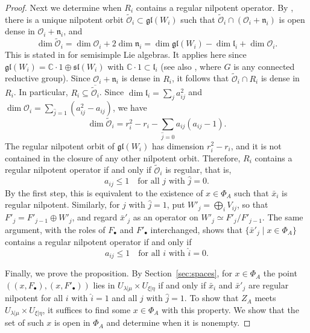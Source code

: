 \documentclass[11pt,a4paper]{amsart}
\theoremstyle{definition}
\theoremstyle{remark}
\newcommand{\C}{\mathbb C}
\newcommand{\lm}{\lambda|\mu}
\newcommand{\xh}{\xi|\eta}
\numberwithin{equation}{section}
\begin{document}
\begin{proof}
Next we determine when $R_i$ contains a regular nilpotent operator. By
\cite[Theorem~7.1.1]{CM}, there is a unique nilpotent orbit
$\widetilde{\mathcal O}_i\subset\mathfrak{gl}(W_i)$ such that
$\widetilde{\mathcal O}_i\cap(\mathcal O_i+\mathfrak n_i)$ is open dense
in $\mathcal O_i+\mathfrak n_i$, and
$$
\dim\widetilde{\mathcal O}_i
=\dim\mathcal O_i+2\dim\mathfrak n_i
=\dim\mathfrak{gl}(W_i)-\dim\mathfrak l_i+\dim\mathcal O_i .
$$
This is stated in \cite{CM} for semisimple Lie algebras. It applies here
since $\mathfrak{gl}(W_i)=\C\cdot1\oplus\mathfrak{sl}(W_i)$ with
$\C\cdot1\subset\mathfrak l_i$ (see also \cite{LS79}, where $G$ is any
connected reductive group). Since $\mathcal O_i+\mathfrak n_i$ is dense in
$R_i$, it follows that $\widetilde{\mathcal O}_i\cap R_i$ is dense in
$R_i$. In particular, $R_i\subseteq\overline{\widetilde{\mathcal O}_i}$.
Since $\dim\mathfrak l_i=\sum_ja_{ij}^2$ and
$\dim\mathcal O_i=\sum_{\widehat j=1}(a_{ij}^2-a_{ij})$, we have
$$
\dim\widetilde{\mathcal O}_i
=r_i^2-r_i-\sum_{\widehat j=0}a_{ij}(a_{ij}-1).
$$
The regular nilpotent orbit of $\mathfrak{gl}(W_i)$ has dimension
$r_i^2-r_i$, and it is not contained in the closure of any other
nilpotent orbit. Therefore, $R_i$ contains a regular nilpotent operator
if and only if $\widetilde{\mathcal O}_i$ is regular, that is,
$$
a_{ij}\le1\quad\text{for all $j$ with $\widehat j=0$}.
$$
By the first step, this is equivalent to the existence of $x\in\Phi_A$
such that $\bar x_i$ is regular nilpotent. Similarly, for $j$ with
$\widehat j=1$, put $W'_j=\bigoplus_iV_{ij}$, so that
$F'_j=F'_{j-1}\oplus W'_j$, and regard $\bar x'_j$ as an operator on
$W'_j\simeq F'_j/F'_{j-1}$. The same argument, with the roles of
$F_\bullet$ and $F'_\bullet$ interchanged, shows that
$\{\bar x'_j\mid x\in\Phi_A\}$ contains a regular nilpotent operator if and
only if
$$
a_{ij}\le1\quad\text{for all $i$ with $\widehat i=0$}.
$$

Finally, we prove the proposition. By Section~\ref{sec:spaces}, for
$x\in\Phi_A$ the point $((x,F_\bullet),(x,F'_\bullet))$ lies in
$U_{\lm}\times U_{\xh}$ if and only if $\bar x_i$ and $\bar x'_j$ are regular
nilpotent for all $i$ with $\widehat i=1$ and all $j$ with $\widehat j=1$.
To show that $Z_A$ meets $U_{\lm}\times U_{\xh}$, it suffices to find some
$x\in\Phi_A$ with this property. We show that the set of such $x$ is open
in $\Phi_A$ and determine when it is nonempty.


\end{proof}
\end{document}
